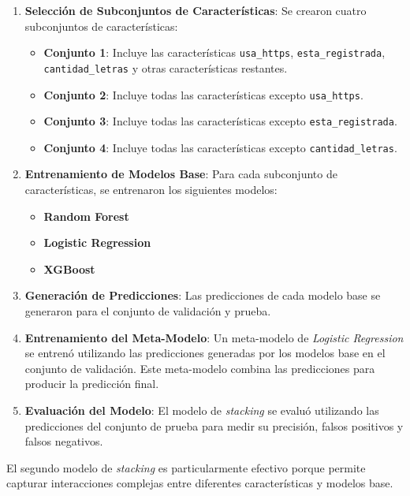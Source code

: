 \begin{enumerate}
    \item \textbf{Selección de Subconjuntos de Características}: Se crearon cuatro subconjuntos de características:
    \begin{itemize}
        \item \textbf{Conjunto 1}: Incluye las características \texttt{usa\_https}, \texttt{esta\_registrada}, \texttt{cantidad\_letras} y otras características restantes.
        \item \textbf{Conjunto 2}: Incluye todas las características excepto \texttt{usa\_https}.
        \item \textbf{Conjunto 3}: Incluye todas las características excepto \texttt{esta\_registrada}.
        \item \textbf{Conjunto 4}: Incluye todas las características excepto \texttt{cantidad\_letras}.
    \end{itemize}

    \item \textbf{Entrenamiento de Modelos Base}: Para cada subconjunto de características, se entrenaron los siguientes modelos:
    \begin{itemize}
        \item \textbf{Random Forest}
        \item \textbf{Logistic Regression}
        \item \textbf{XGBoost}
    \end{itemize}

    \item \textbf{Generación de Predicciones}: Las predicciones de cada modelo base se generaron para el conjunto de validación y prueba.

    \item \textbf{Entrenamiento del Meta-Modelo}: Un meta-modelo de \textit{Logistic Regression} se entrenó utilizando las predicciones generadas por los modelos base en el conjunto de validación. Este meta-modelo combina las predicciones para producir la predicción final.

    \item \textbf{Evaluación del Modelo}: El modelo de \textit{stacking} se evaluó utilizando las predicciones del conjunto de prueba para medir su precisión, falsos positivos y falsos negativos.
\end{enumerate}

El segundo modelo de \textit{stacking} es particularmente efectivo porque permite capturar interacciones complejas entre diferentes características y modelos base.




